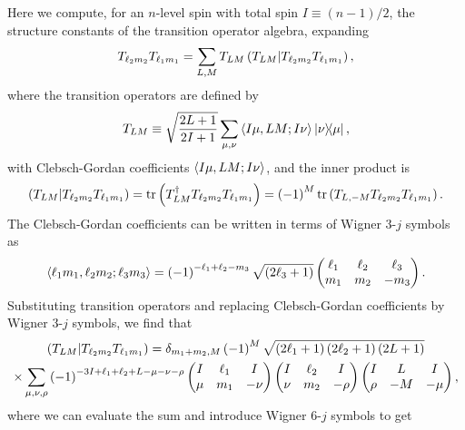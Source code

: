 \documentclass[nofootinbib,notitlepage,11pt]{revtex4-2}
\newcommand{\f}[2]{\dfrac{#1}{#2}} %
\newcommand{\p}[1]{\left(#1\right)} %
\newcommand{\bk}{\Braket} %
\newcommand{\1}{\mathds{1}}
\def\obk#1{\mathinner{({#1})}}
\begin{document}
Here we compute, for an $n$-level spin with total spin
$I\equiv\p{n-1}/2$, the structure constants of the transition operator
algebra, expanding
\begin{align}
  T_{\ell_2 m_2} T_{\ell_1 m_1}
  = \sum_{L,M} T_{LM} \obk{T_{LM} | T_{\ell_2 m_2} T_{\ell_1 m_1}},
\end{align}
where the transition operators are defined by
\begin{align}
  T_{LM} \equiv \sqrt{\f{2L+1}{2I+1}}
  \sum_{\mu,\nu} \bk{I\mu,LM;I\nu} \op{\nu}{\mu},
\end{align}
with Clebsch-Gordan coefficients $\bk{I\mu,LM;I\nu}$, and the inner
product is
\begin{align}
  \obk{T_{LM} | T_{\ell_2 m_2} T_{\ell_1 m_1}}
  = \tr\p{T_{LM}^\dag T_{\ell_2 m_2} T_{\ell_1 m_1}}
  = \p{-1}^M \tr\p{T_{L,-M} T_{\ell_2 m_2} T_{\ell_1 m_1}}.
\end{align}
The Clebsch-Gordan coefficients can be written in terms of Wigner
3-$j$ symbols as
\begin{align}
  \bk{\ell_1 m_1, \ell_2 m_2;\ell_3 m_3}
  = \p{-1}^{-\ell_1+\ell_2-m_3} \sqrt{\p{2\ell_3+1}}
  \begin{pmatrix}
    \ell_1 & \ell_2 & \ell_3 \\
    m_1 & m_2 & -m_3
  \end{pmatrix}.
\end{align}
Substituting transition operators and replacing Clebsch-Gordan
coefficients by Wigner 3-$j$ symbols, we find that
\begin{multline}
  \obk{T_{LM} | T_{\ell_2 m_2} T_{\ell_1 m_1}}
  = \delta_{m_1+m_2,M}
  \p{-1}^M \sqrt{\p{2\ell_1+1}\p{2\ell_2+1}\p{2L+1}} \\
  \times \sum_{\mu,\nu,\rho} \p{-1}^{-3I+\ell_1+\ell_2+L-\mu-\nu-\rho}
  \begin{pmatrix}
    I & \ell_1 & I \\
    \mu & m_1 & -\nu
  \end{pmatrix}
  \begin{pmatrix}
    I & \ell_2 & I \\
    \nu & m_2 & -\rho
  \end{pmatrix}
  \begin{pmatrix}
    I & L & I \\
    \rho & -M & -\mu
  \end{pmatrix},
\end{multline}
where we can evaluate the sum and introduce Wigner 6-$j$ symbols to
get
\end{document}
